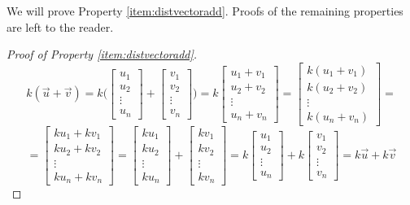 \documentclass{ximera}
\begin{document}
We will prove Property \ref{item:distvectoradd}.  Proofs of the remaining properties are left to the reader.
\begin{proof}[Proof of Property \ref{item:distvectoradd}]
$$
k(\vec{u}+\vec{v})=k\Bigg(\begin{bmatrix}
u_1\\
u_2\\
\vdots\\
u_n
\end{bmatrix}+\begin{bmatrix}
v_1\\
v_2\\
\vdots\\
v_n
\end{bmatrix}\Bigg)=k\begin{bmatrix}
u_1+v_1\\
u_2+v_2\\
\vdots\\
u_n+v_n
\end{bmatrix}=\begin{bmatrix}
k(u_1+v_1)\\
k(u_2+v_2)\\
\vdots\\
k(u_n+v_n)
\end{bmatrix}=$$
$$=\begin{bmatrix}
ku_1+kv_1\\
ku_2+kv_2\\
\vdots\\
ku_n+kv_n
\end{bmatrix}=\begin{bmatrix}
ku_1\\
ku_2\\
\vdots\\
ku_n
\end{bmatrix}+\begin{bmatrix}
kv_1\\
kv_2\\
\vdots\\
kv_n
\end{bmatrix}=k\begin{bmatrix}
u_1\\
u_2\\
\vdots\\
u_n
\end{bmatrix}+k\begin{bmatrix}
v_1\\
v_2\\
\vdots\\
v_n
\end{bmatrix}
=k\vec{u}+k\vec{v}$$
\end{proof}
\end{document}
